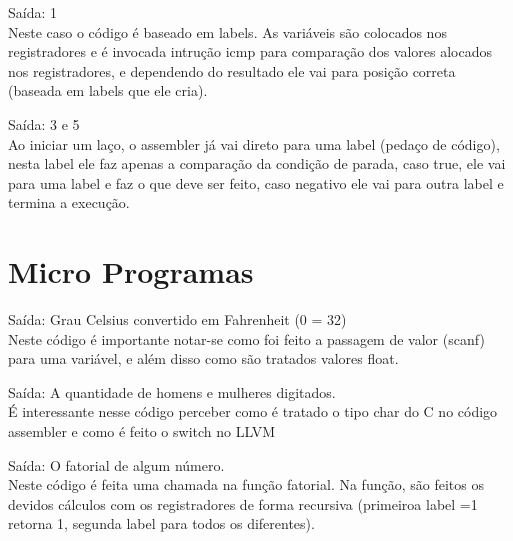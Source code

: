 \documentclass[12pt,a4paper,twoside]{report}
\begin{document}


Saída: 1\\
Neste caso o código é baseado em labels. As variáveis são colocados nos registradores e é invocada intrução icmp para comparação dos valores alocados nos registradores, e dependendo do resultado ele vai para posição correta (baseada em labels que ele cria).



Saída: 3 e 5\\
Ao iniciar um laço, o assembler já vai direto para uma label (pedaço de código), nesta label ele faz apenas a comparação da condição de parada, caso true, ele vai para uma label e faz o que deve ser feito, caso negativo ele vai para outra label e termina a execução.

\section{Micro Programas}



Saída: Grau Celsius convertido em Fahrenheit (0 = 32)\\
Neste código é importante notar-se como foi feito a passagem de valor (scanf) para uma variável, e além disso como são tratados valores float.



Saída: A quantidade de homens e mulheres digitados.\\
É interessante nesse código perceber como é tratado o tipo char do C no código assembler e como é feito o switch no LLVM



Saída: O fatorial de algum número.\\
Neste código é feita uma chamada na função fatorial. Na função, são feitos os devidos cálculos com os registradores de forma recursiva (primeiroa label =1 retorna 1, segunda label para todos os diferentes).
\end{document}
